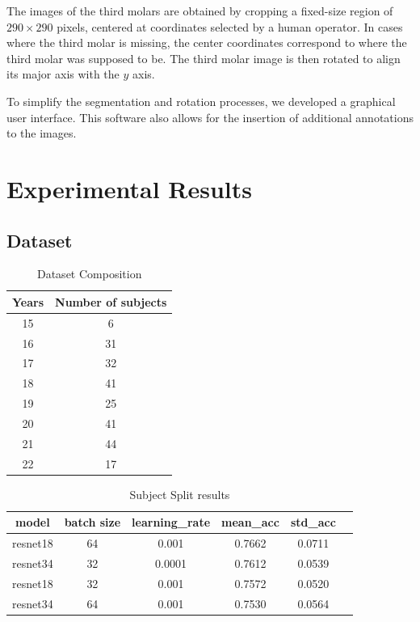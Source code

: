 \documentclass[conference]{IEEEtran}
\begin{document}
The images of the third molars are obtained by cropping a fixed-size region of $290 \times 290$ pixels, centered at coordinates selected by a human operator. In cases where the third molar is missing, the center coordinates correspond to where the third molar was supposed to be. The third molar image is then rotated to align its major axis with the $y$ axis.

To simplify the segmentation and rotation processes, we developed a graphical user interface. This software also allows for the insertion of additional annotations to the images.

\section{Experimental Results}
\subsection{Dataset}

\begin{table}[t]
	\centering
	\caption{Dataset Composition}
	\begin{tabular}{cc}
		\hline
		\hline
		Years & Number of subjects \\
		\hline
		15    & 6 \\
		16    & 31 \\
		17    & 32 \\
		18    & 41 \\
		19    & 25 \\
		20    & 41 \\
		21    & 44 \\
		22    & 17 \\
		\hline
		\hline
	\end{tabular}%
	\label{tabDB}%
\end{table}%

\begin{table}[t]
	\centering
	\caption{Subject Split results}
	\begin{tabular}{cccccc}
		\hline
		\hline
		model & batch size & learning\_rate & mean\_acc & std\_acc \\
		\hline
		resnet18 & 64 & 0.001 & 0.7662 & 0.0711 \\ 
		resnet34 & 32 & 0.0001 & 0.7612 & 0.0539 \\ 
		resnet18 & 32 & 0.001 & 0.7572 & 0.0520 \\ 
		resnet34 & 64 & 0.001 & 0.7530 & 0.0564 \\ 

		\hline
		\hline
	\end{tabular}
	\label{tab:SubjectSplit}
\end{table}
\end{document}
